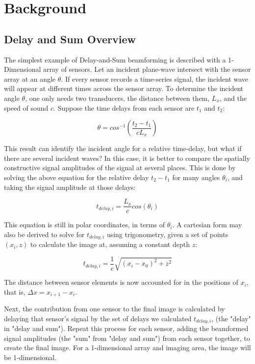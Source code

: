 \chapter{Background}
\label{chapter2:background}
\graphicspath{{Chapter-2/graphics/}}

\section{Delay and Sum Overview}
\label{chapter2:das_Overview}
The simplest example of Delay-and-Sum beamforming is described with a 1-Dimensional array of sensors. Let an incident plane-wave intersect with the sensor array at an angle $\theta$. If every sensor records a time-series signal, the incident wave will appear at different times across the sensor array. To determine the incident angle $\theta$, one only needs two transducers, the distance between them, $L_x$, and the speed of sound $c$. Suppose the time delays from each sensor are $t_1$ and $t_2$:

\begin{equation} 
    \theta = cos^{-1}(\frac{t_2 - t_1}{c L_x})
\end{equation}

This result can identify the incident angle for a relative time-delay, but what if there are several incident waves? In this case, it is better to compare the spatially constructive signal amplitudes of the signal at several places. This is done by solving the above equation for the relative delay $t_2 - t_1$ for many angles $\theta_i$, and taking the signal amplitude at those delays:

\begin{equation}
    t_{delay,i} = \frac{L_x}{c} cos(\theta_i)
\end{equation}

This equation is still in polar coordinates, in terms of $\theta_i$. A cartesian form may also be derived to solve for $t_{delay,i}$ using trigonometry, given a set of points $(x_i,z)$ to calculate the image at, assuming a constant depth $z$:

\begin{equation} 
    t_{delay,i} = \frac{1}{c} \sqrt{(x_i - x_0)^2 + z^2}
\end{equation}

The distance between sensor elements is now accounted for in the positions of $x_i$, that is, $\Delta{x} = x_{i+1} - x_i$.

Next, the contribution from one sensor to the final image is calculated by delaying that sensor's signal by the set of delays we calculated $t_{delay,i}$, (the "delay" in "delay and sum"). Repeat this process for each sensor, adding the beamformed signal amplitudes (the "sum" from "delay and sum") from each sensor together, to create the final image. For a 1-dimensional array and imaging area, the image will be 1-dimensional.

